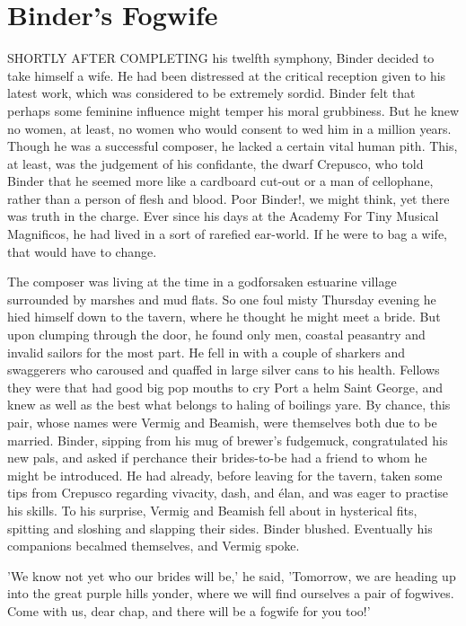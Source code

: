 \chapter{Binder's Fogwife}

SHORTLY AFTER COMPLETING his twelfth symphony, Binder decided to take himself a wife. He had been distressed at the critical reception given to his latest work, which was considered to be extremely sordid. Binder felt that perhaps some feminine influence might temper his moral grubbiness. But he knew no women, at least, no women who would consent to wed him in a million years. Though he was a successful composer, he lacked a certain vital human pith. This, at least, was the judgement of his confidante, the dwarf Crepusco, who told Binder that he seemed more like a cardboard cut-out or a man of cellophane, rather than a person of flesh and blood. Poor Binder!, we might think, yet there was truth in the charge. Ever since his days at the Academy For Tiny Musical Magnificos, he had lived in a sort of rarefied ear-world. If he were to bag a wife, that would have to change.

The composer was living at the time in a godforsaken estuarine village surrounded by marshes and mud flats. So one foul misty Thursday evening he hied himself down to the tavern, where he thought he might meet a bride. But upon clumping through the door, he found only men, coastal peasantry and invalid sailors for the most part. He fell in with a couple of sharkers and swaggerers who caroused and quaffed in large silver cans to his health. Fellows they were that had good big pop mouths to cry Port a helm Saint George, and knew as well as the best what belongs to haling of boilings yare. By chance, this pair, whose names were Vermig and Beamish, were themselves both due to be married. Binder, sipping from his mug of brewer's fudgemuck, congratulated his new pals, and asked if perchance their brides-to-be had a friend to whom he might be introduced. He had already, before leaving for the tavern, taken some tips from Crepusco regarding vivacity, dash, and \'{e}lan, and was eager to practise his skills. To his surprise, Vermig and Beamish fell about in hysterical fits, spitting and sloshing and slapping their sides. Binder blushed. Eventually his companions becalmed themselves, and Vermig spoke.

'We know not yet who our brides will be,' he said, 'Tomorrow, we are heading up into the great purple hills yonder, where we will find ourselves a pair of fogwives. Come with us, dear chap, and there will be a fogwife for you too!'

